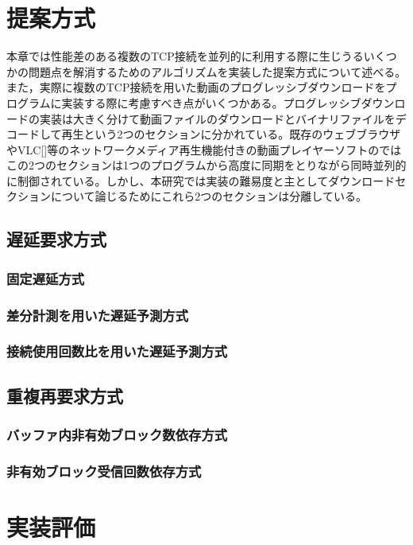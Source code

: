 \documentclass[a4j,12pt]{gradthesis_utf8}
\begin{document}
\chapter{提案方式}\label{sec:sec3}
本章では性能差のある複数のTCP接続を並列的に利用する際に生じうるいくつかの問題点を解消するためのアルゴリズムを実装した提案方式について述べる。\\
また，実際に複数のTCP接続を用いた動画のプログレッシブダウンロードをプログラムに実装する際に考慮すべき点がいくつかある。プログレッシブダウンロードの実装は大きく分けて動画ファイルのダウンロードとバイナリファイルをデコードして再生という2つのセクションに分かれている。既存のウェブブラウザやVLC[]等のネットワークメディア再生機能付きの動画プレイヤーソフトのではこの2つのセクションは1つのプログラムから高度に同期をとりながら同時並列的に制御されている。しかし、本研究では実装の難易度と主としてダウンロードセクションについて論じるためにこれら2つのセクションは分離している。
\section{遅延要求方式}
\subsection{固定遅延方式}

\subsection{差分計測を用いた遅延予測方式}

\subsection{接続使用回数比を用いた遅延予測方式}

\section{重複再要求方式}
\subsection{バッファ内非有効ブロック数依存方式}
\subsection{非有効ブロック受信回数依存方式}

\chapter{実装評価}\label{sec:sec4}
\end{document}

